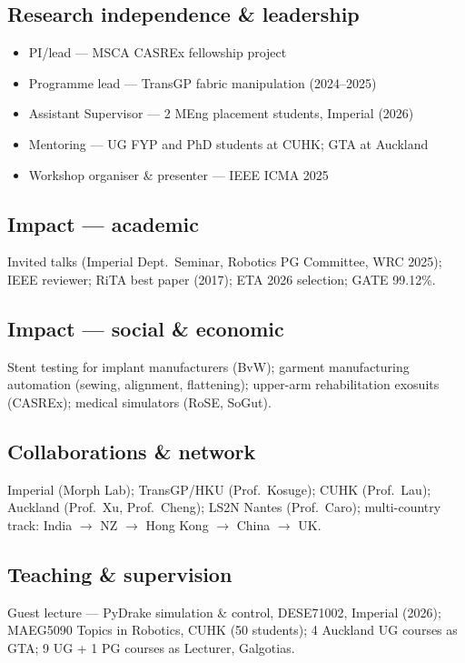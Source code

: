 \documentclass[11pt,a4paper]{article}
\begin{document}
\subsection*{\sffamily\color{accent} Research independence \& leadership}
\begin{itemize}[leftmargin=1.4em, itemsep=0.35em]
  \item PI/lead --- MSCA CASREx fellowship project
  \item Programme lead --- TransGP fabric manipulation (2024--2025)
  \item Assistant Supervisor --- 2 MEng placement students, Imperial (2026)
  \item Mentoring --- UG FYP and PhD students at CUHK; GTA at Auckland
  \item Workshop organiser \& presenter --- IEEE ICMA 2025
\end{itemize}

\subsection*{\sffamily\color{accent} Impact --- academic}
Invited talks (Imperial Dept.\ Seminar, Robotics PG Committee, WRC 2025); IEEE reviewer; RiTA best paper (2017); ETA 2026 selection; GATE 99.12\%.

\subsection*{\sffamily\color{accent} Impact --- social \& economic}
Stent testing for implant manufacturers (BvW); garment manufacturing automation (sewing, alignment, flattening); upper-arm rehabilitation exosuits (CASREx); medical simulators (RoSE, SoGut).

\subsection*{\sffamily\color{accent} Collaborations \& network}
Imperial (Morph Lab); TransGP/HKU (Prof.\ Kosuge); CUHK (Prof.\ Lau); Auckland (Prof.\ Xu, Prof.\ Cheng); LS2N Nantes (Prof.\ Caro); multi-country track: India $\to$ NZ $\to$ Hong Kong $\to$ China $\to$ UK.

\subsection*{\sffamily\color{accent} Teaching \& supervision}
Guest lecture --- PyDrake simulation \& control, DESE71002, Imperial (2026); MAEG5090 Topics in Robotics, CUHK (50 students); 4 Auckland UG courses as GTA; 9 UG + 1 PG courses as Lecturer, Galgotias.
\end{document}
